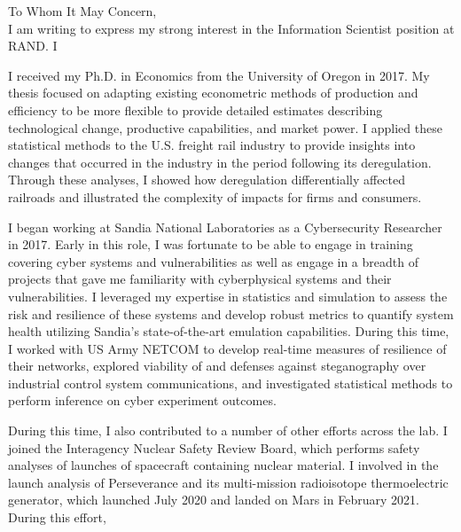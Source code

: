 \documentclass[11pt]{article}
\begin{document}
\noindent To Whom It May Concern,\\

\noindent I am writing to express my strong interest in the Information Scientist position at RAND. I 

I received my Ph.D. in Economics from the University of Oregon in 2017. My thesis focused on adapting existing econometric methods of production and efficiency to be more flexible to provide detailed estimates describing technological change, productive capabilities, and market power. I applied these statistical methods to the U.S. freight rail industry to provide insights into changes that occurred in the industry in the period following its deregulation. Through these analyses, I showed how deregulation differentially affected railroads and illustrated the complexity of impacts for firms and consumers. 

I began working at Sandia National Laboratories as a Cybersecurity Researcher in 2017. Early in this role, I was fortunate to be able to engage in training covering cyber systems and vulnerabilities as well as engage in a breadth of projects that gave me familiarity with cyberphysical systems and their vulnerabilities. I leveraged my expertise in statistics and simulation to assess the risk and resilience of these systems and develop robust metrics to quantify system health utilizing Sandia's state-of-the-art emulation capabilities. During this time, I worked with US Army NETCOM to develop real-time measures of resilience of their networks, explored viability of and defenses against steganography over industrial control system communications, and investigated statistical methods to perform inference on cyber experiment outcomes.

During this time, I also contributed to a number of other efforts across the lab. I joined the Interagency Nuclear Safety Review Board, which performs safety analyses of launches of spacecraft containing nuclear material. I involved in the launch analysis of Perseverance and its multi-mission radioisotope thermoelectric generator, which launched July 2020 and landed on Mars in February 2021. During this effort, 
\end{document}
